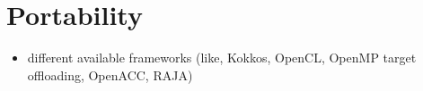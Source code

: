 \section{Portability}

\begin{itemize}
    \item different available frameworks (like, Kokkos, OpenCL, OpenMP target offloading, OpenACC, RAJA)
\end{itemize}
